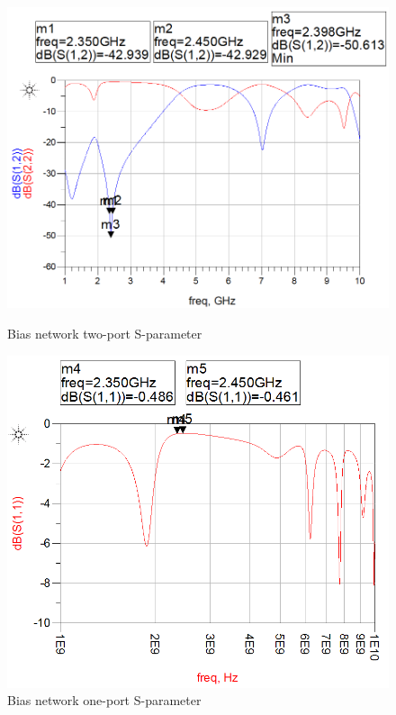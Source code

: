   \begin{figure}[h]
	  \begin{minipage}[b]{.45\textwidth}
	  \centering
	  \includegraphics[width=\linewidth]{img/Bias_filter_two_port_s_parm}
	  \caption{Bias network two-port S-parameter}
  	  \label{fig:Biastwos}
  \end{minipage}%
  \begin{minipage}{.1\textwidth}
	  \hspace{\linewidth}
  \end{minipage}%
  \begin{minipage}[b]{.45\textwidth}
	  \centering
	  \includegraphics[width=\linewidth]{img/Bias_filter_one_port_s_parm}
  	  \caption{Bias network one-port S-parameter}
  	  \label{fig:Biasones}
  \end{minipage}
  \end{figure}


